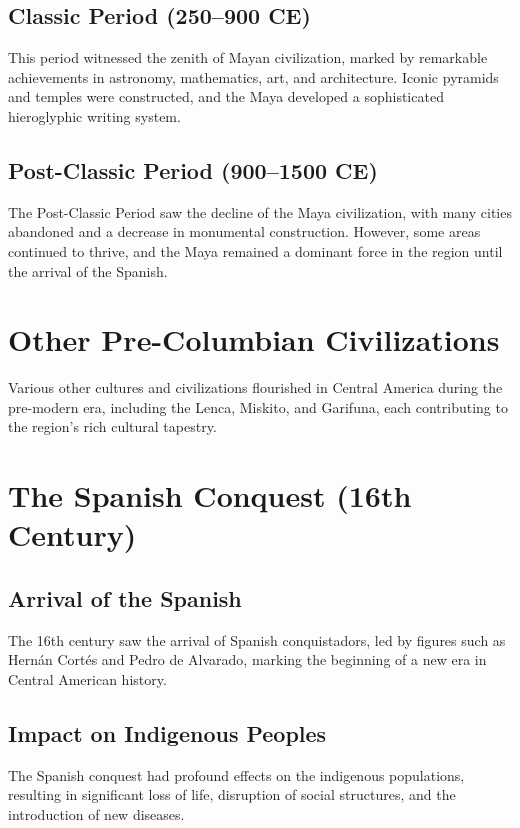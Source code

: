 \documentclass[a4paper,12pt]{book}
\begin{document}
\subsection{Classic Period (250–900 CE)}
\label{subsec:classic-maya}
This period witnessed the zenith of Mayan civilization, marked by remarkable achievements in astronomy, mathematics, art, and architecture. Iconic pyramids and temples were constructed, and the Maya developed a sophisticated hieroglyphic writing system.

\subsection{Post-Classic Period (900–1500 CE)}
\label{subsec:post-classic-maya}
The Post-Classic Period saw the decline of the Maya civilization, with many cities abandoned and a decrease in monumental construction. However, some areas continued to thrive, and the Maya remained a dominant force in the region until the arrival of the Spanish.

\section{Other Pre-Columbian Civilizations}
\label{sec:other-pre-columbian-civilizations}
Various other cultures and civilizations flourished in Central America during the pre-modern era, including the Lenca, Miskito, and Garifuna, each contributing to the region's rich cultural tapestry.

\section{The Spanish Conquest (16th Century)}
\label{sec:spanish-conquest}
\subsection{Arrival of the Spanish}
\label{subsec:arrival-spanish}
The 16th century saw the arrival of Spanish conquistadors, led by figures such as Hernán Cortés and Pedro de Alvarado, marking the beginning of a new era in Central American history.

\subsection{Impact on Indigenous Peoples}
\label{subsec:impact-indigenous-peoples}
The Spanish conquest had profound effects on the indigenous populations, resulting in significant loss of life, disruption of social structures, and the introduction of new diseases.
\end{document}
